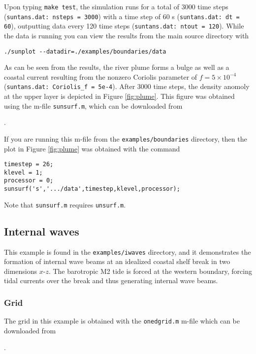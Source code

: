 Upon typing \verb+make test+, the simulation runs for a total of 3000 time steps (\verb+suntans.dat: nsteps = 3000+)
with a time step of 60 s (\verb+suntans.dat: dt = 60+), outputting
data every 120 time steps (\verb+suntans.dat: ntout = 120+).  While the data is running you can view the
results from the main source directory with
\begin{verbatim}
./sunplot --datadir=./examples/boundaries/data
\end{verbatim}
As can be seen from the results, the river plume forms a bulge as well as a coastal current resulting from
the nonzero Coriolis parameter of $f=5\times 10^{-4}$ (\verb+suntans.dat: Coriolis_f = 5e-4+).
After 3000 time steps, the density anomoly at the upper layer is depicted in Figure \ref{fig:plume}.  This
figure was obtained using the m-file \verb+sunsurf.m+, which can be downloaded from

\medskip
\noindent
\mfiledownload.

\medskip
\noindent
If you are running this m-file from the \verb+examples/boundaries+ directory, then the plot in Figure \ref{fig:plume}
was obtained with the command
\begin{verbatim}
timestep = 26;
klevel = 1;
processor = 0;
sunsurf('s','.../data',timestep,klevel,processor);
\end{verbatim}
Note that \verb+sunsurf.m+ requires \verb+unsurf.m+. 

\subsection{Internal waves} \label{sec:internalwaves}

This example is found in the \verb+examples/iwaves+ directory, and it demonstrates the formation
of internal wave beams at an idealized coastal shelf break in two dimensions $x$-$z$.  The barotropic
M2 tide is forced at the western boundary, forcing tidal currents over the break and thus generating
internal wave beams.

\subsubsection{Grid}

The grid in this example is obtained with the 
\verb+onedgrid.m+ m-file which can be downloaded from 

\medskip
\noindent
\mfiledownload.

